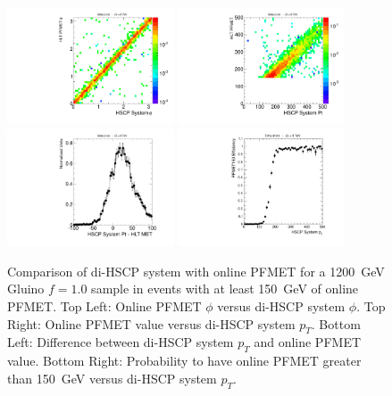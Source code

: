\begin{figure}
  \begin{center}
      \includegraphics[clip=true, trim=0.0cm 0cm 3.0cm 0cm, width=0.44\textwidth]{figures/search/Gluino_8TeV_M1200_f100SystPhiMET}
      \includegraphics[clip=true, trim=0.0cm 0cm 3.0cm 0cm, width=0.44\textwidth]{figures/search/Gluino_8TeV_M1200_f100SystPtMET} \\
      \includegraphics[clip=true, trim=0.0cm 0cm 3.0cm 0cm, width=0.44\textwidth]{figures/search/Gluino_8TeV_M1200_f100SystPtDiffMET}
      \includegraphics[clip=true, trim=0.0cm 0cm 3.0cm 0cm, width=0.44\textwidth]{figures/search/Gluino_8TeV_M1200_f100SystPtEff}
      \caption[Comparison of di-HSCP system $\phi$ and \pt\ with online PFMET for a 1200~GeV 
Gluino $f=1.0$ sample in events with at least 150~GeV of online PFMET.]
        {Comparison of di-HSCP system with online PFMET for a 1200~GeV Gluino $f=1.0$ sample in events with at least 150~GeV of online PFMET. 
         Top Left: Online PFMET $\phi$ versus di-HSCP system $\phi.$ Top Right: Online PFMET value versus di-HSCP system $p_T$. 
         Bottom Left: Difference between di-HSCP system $p_T$ and online PFMET value.
         Bottom Right: Probability to have online PFMET greater than 150~GeV versus di-HSCP system $p_T$.
        }
      \label{fig:SystPtTrigger}
  \end{center}
\end{figure}

